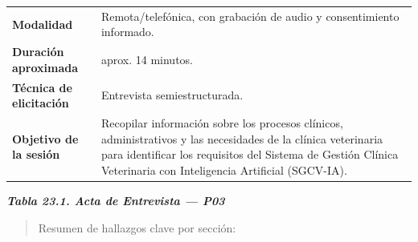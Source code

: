 \documentclass[
]{article}
\begin{document}
{\begin{longtable}[]{|
  >{\raggedright\arraybackslash}p{}|
  >{\raggedright\arraybackslash}p{}|}
\begin{minipage}[t]{\linewidth}
\end{minipage} \\
\hline
\textbf{Modalidad} & \begin{minipage}[t]{\linewidth}\raggedright
Remota/telefónica, con grabación de audio y consentimiento informado.
\end{minipage} \\
\hline
\textbf{Duración aproximada} & \begin{minipage}[t]{\linewidth}\raggedright
aprox. 14 minutos.
\end{minipage} \\
\hline
\textbf{Técnica de elicitación} & \begin{minipage}[t]{\linewidth}\raggedright
Entrevista semiestructurada.
\end{minipage} \\
\hline
\textbf{Objetivo de la sesión} & \begin{minipage}[t]{\linewidth}\raggedright
Recopilar información sobre los procesos clínicos, administrativos y las necesidades de la clínica veterinaria para identificar los requisitos del Sistema de Gestión Clínica Veterinaria con Inteligencia Artificial (SGCV-IA).
\end{minipage} \\
\hline
\end{longtable}
}

\protect{}\label{_bookmark_P03_acta}{}\emph{\textbf{Tabla 23.1. Acta de Entrevista --- P03}}

\begin{quote}
Resumen de hallazgos clave por sección:
\end{quote}
\end{document}
